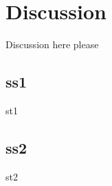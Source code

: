 \documentclass[../main.tex]{subfiles}
\begin{document}
\section{Discussion}
Discussion here please

	\subsection{ss1}
	st1

	\subsection{ss2}
	st2
\end{document}
